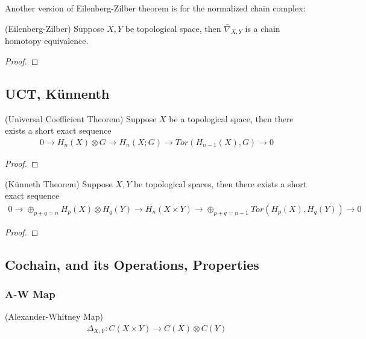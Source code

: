 \documentclass[Total.tex]{subfiles}
\begin{document}
				Another version of Eilenberg-Zilber theorem is for the normalized chain complex:
				\begin{theorem}
					(Eilenberg-Zilber) Suppose $X,Y$ be topological space, then $\bar{\nabla}_{X,Y}$ is a chain homotopy equivalence.
				\end{theorem}
				\begin{proof}	
				\end{proof}
			\subsection{UCT, Künnenth}
				\begin{theorem}
					(Universal Coefficient Theorem) Suppose $X$ be a topological space, then there exists a short exact sequence
					\begin{gather*}
						0\rightarrow H_n(X)\otimes G\rightarrow H_n(X;G)\rightarrow Tor(H_{n-1}(X),G)\rightarrow 0
					\end{gather*}
				\end{theorem}
				\begin{proof}
					
				\end{proof}
				\begin{theorem}
					(Künneth Theorem) Suppose $X,Y$ be topological spaces, then there exists a short exact sequence
					\begin{gather*}
						0\rightarrow \oplus_{p+q=n}H_p(X)\otimes H_q(Y)\rightarrow H_n(X\times Y)\rightarrow \oplus_{p+q=n-1}Tor(H_p(X),H_q(Y))\rightarrow 0
					\end{gather*}
				\end{theorem}
				\begin{proof}
					
				\end{proof}
		\subsection{Cochain, and its Operations, Properties}
				\begin{Def}
					
				\end{Def}
			\subsubsection{A-W Map}
				\begin{Def}
					(Alexander-Whitney Map)
					\begin{gather*}\Delta_{X,Y}:C(X\times Y)\rightarrow C(X)\otimes C(Y)
					\end{gather*}
				\end{Def}
\end{document}
